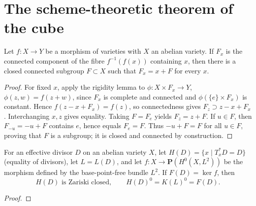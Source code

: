 
\section{The scheme-theoretic theorem of the cube}
\label{mumford-III10-source}

\begin{proposition}
\label{mumford-prop-abelian-fibre-kernel}
Let $f:X\to Y$ be a morphism of varieties with $X$ an abelian variety. If
$F_x$ is the connected component of the fibre $f^{-1}(f(x))$ containing $x$,
then there is a closed connected subgroup $F\subset X$ such that
$F_x=x+F$ for every $x$.
\end{proposition}
\begin{proof}
For fixed $x$, apply the rigidity lemma to
$\phi:X\times F_x\to Y$, $\phi(z,w)=f(z+w)$, since $F_x$ is complete and
connected and $\phi(\{e\}\times F_x)$ is constant. Hence
$f(z-x+F_x)=f(z)$, so connectedness gives
$F_z\supset z-x+F_x$. Interchanging $x,z$ gives equality. Taking
$F=F_e$ yields $F_z=z+F$. If $u\in F$, then
$F_{-u}=-u+F$ contains $e$, hence equals $F_e=F$. Thus $-u+F=F$ for all
$u\in F$, proving that $F$ is a subgroup; it is closed and connected by
construction.
\end{proof}

\begin{theorem}
\label{mumford-thm-effective-divisor-stabilizer}
For an effective divisor $D$ on an abelian variety $X$, let
$H(D)=\{x\mid T_x^*D=D\}$ (equality of divisors), let $L=L(D)$, and let
$f:X\to\mathbf P(H^0(X,L^2))$ be the morphism defined by the base-point-free
bundle $L^2$. If $F(D)=\ker f$, then
\[
H(D)\text{ is Zariski closed},\qquad H(D)^0=K(L)^0=F(D).
\]
\end{theorem}
\begin{proof}
\notready
\end{proof}

